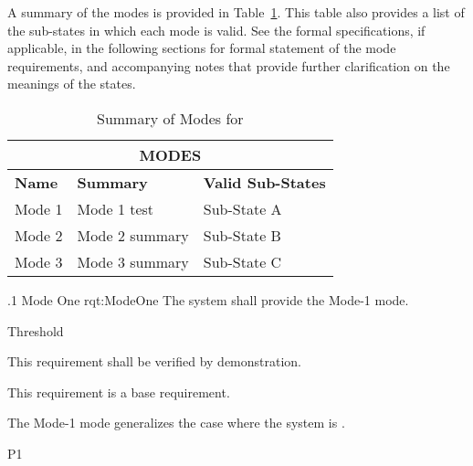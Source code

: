 
A summary of the modes is provided in Table~\ref{tab:Modes}.
This table also provides a list of the sub-states in which each mode is valid.
See the formal specifications, if applicable, in the following sections for formal statement of the mode requirements, and accompanying notes that provide further clarification on the meanings of the states.
\begin{table}[htbp]
	\begin{center}
		\begin{tabular}{|p{1.0in}|p{4.0in}|p{1.0in}|}
			\hline
			\hline
			     \multicolumn{3}{|c|}{{\bf MODES}}\\
			\hline
{\bf Name} & {\bf Summary}	& {\bf Valid Sub-States}\\
			\hline
			\hline
Mode 1 & Mode 1 test & Sub-State A\\ \hline
Mode 2 & Mode 2 summary & Sub-State B\\ \hline
Mode 3 & Mode 3 summary & Sub-State C\\ 
			\hline
			\hline
			\end{tabular}
				\caption{Summary of Modes for \ThisSystem}
				\label{tab:Modes}
		\end{center}
\end{table}


\ONERQMTV
{\RqtNumberBase.1}
{Mode One}
{rqt:ModeOne}
{The system shall provide the Mode-1 mode.}
{
	\item [Phase 1] Threshold
}
{This requirement shall be verified by demonstration.}
{
	\item [N/A] This requirement is a base requirement.
}
{
	\item The Mode-1 mode generalizes the case where the system is \TBD.
}
{P1}


